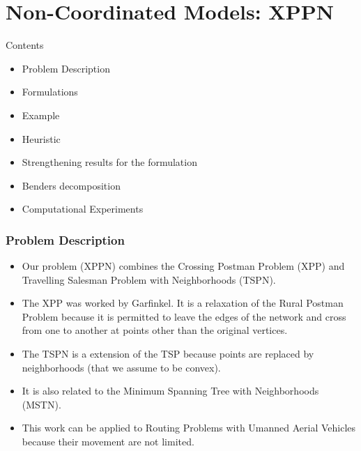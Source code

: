 \documentclass[slidestop,usepdftitle=false,10pt]{beamer}
\begin{document}
	\section{Non-Coordinated Models: XPPN}
	\begin{frame}{Contents}
	    \begin{itemize}
		    \item Problem Description
		    \item Formulations
		    \item Example
		    \item Heuristic
		    \item Strengthening results for the formulation
		    \item Benders decomposition
		    \item Computational Experiments
		\end{itemize}
	\end{frame}
	\begin{frame}
		\frametitle{Problem Description}
		\begin{itemize}
			\item Our problem (XPPN) combines the Crossing Postman Problem (XPP) and Travelling Salesman Problem with Neighborhoods (TSPN). 
			\item The XPP was worked by Garfinkel. It is a relaxation of the Rural Postman Problem because it is permitted to leave the edges of the network and cross from one to another at points other than the original vertices.
			\item The TSPN is a extension of the TSP because points are replaced by neighborhoods (that we assume to be convex).
			\item It is also related to the Minimum Spanning Tree with Neighborhoods (MSTN).
			\item This work can be applied to Routing Problems with Umanned Aerial Vehicles because their movement are not limited.
		\end{itemize}
	\end{frame}
	
\end{document}
